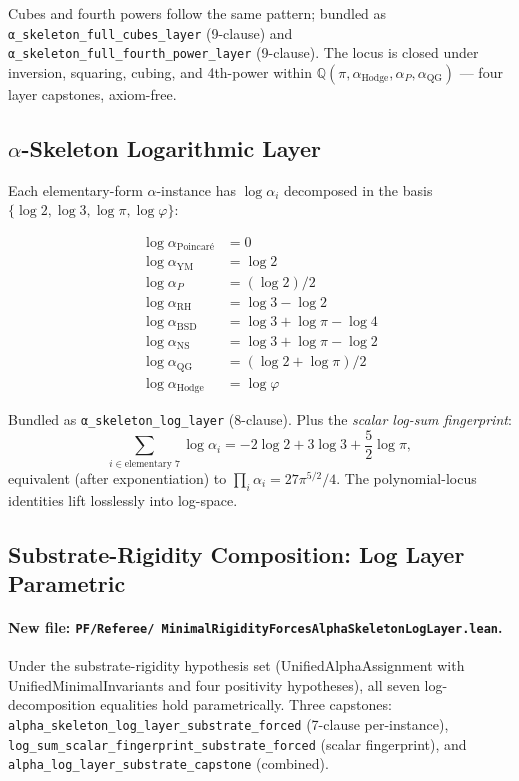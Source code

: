 Cubes and fourth powers follow the same pattern; bundled as
\verb|α_skeleton_full_cubes_layer| (9-clause) and
\verb|α_skeleton_full_fourth_power_layer| (9-clause). The locus is
closed under inversion, squaring, cubing, and 4th-power within
$\mathbb{Q}(\pi, \alpha_{\text{Hodge}}, \alpha_P, \alpha_{\text{QG}})$
--- four layer capstones, axiom-free.

\subsection{\texorpdfstring{$\alpha$}{alpha}-Skeleton Logarithmic Layer}

Each elementary-form $\alpha$-instance has $\log \alpha_i$ decomposed
in the basis $\{\log 2, \log 3, \log \pi, \log \varphi\}$:

\begin{align*}
\log \alpha_{\text{Poincar\'e}} &= 0 \\
\log \alpha_{\text{YM}} &= \log 2 \\
\log \alpha_P &= (\log 2)/2 \\
\log \alpha_{\text{RH}} &= \log 3 - \log 2 \\
\log \alpha_{\text{BSD}} &= \log 3 + \log \pi - \log 4 \\
\log \alpha_{\text{NS}} &= \log 3 + \log \pi - \log 2 \\
\log \alpha_{\text{QG}} &= (\log 2 + \log \pi)/2 \\
\log \alpha_{\text{Hodge}} &= \log \varphi
\end{align*}

Bundled as \verb|α_skeleton_log_layer| (8-clause). Plus the
\emph{scalar log-sum fingerprint}:
\[
\sum_{i \in \text{elementary 7}} \log \alpha_i
  = -2\log 2 + 3\log 3 + \frac{5}{2}\log \pi,
\]
equivalent (after exponentiation) to
$\prod_i \alpha_i = 27\pi^{5/2}/4$. The polynomial-locus identities
lift losslessly into log-space.

\subsection{Substrate-Rigidity Composition: Log Layer Parametric}

\paragraph{\texorpdfstring{New file: \texttt{PF/Referee/
  MinimalRigidityForcesAlphaSkeletonLogLayer.lean}.}{New file: PF/Referee/MinimalRigidityForcesAlphaSkeletonLogLayer.lean.}}
Under the substrate-rigidity hypothesis set (UnifiedAlphaAssignment
with UnifiedMinimalInvariants and four positivity hypotheses), all
seven log-decomposition equalities hold parametrically. Three
capstones:
\verb|alpha_skeleton_log_layer_substrate_forced| (7-clause per-instance),
\verb|log_sum_scalar_fingerprint_substrate_forced| (scalar
fingerprint), and
\verb|alpha_log_layer_substrate_capstone| (combined).

